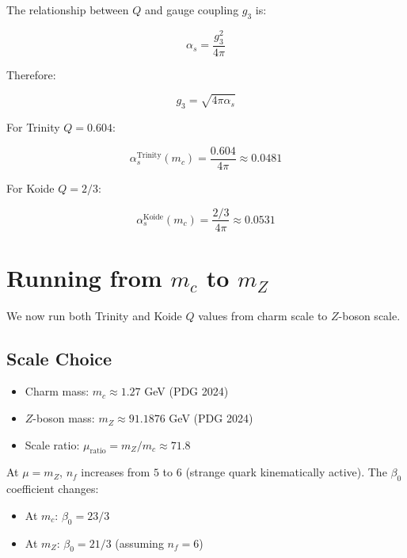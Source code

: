\documentclass{article}
\begin{document}
\begin{table}[h]
The relationship between $Q$ and gauge coupling $g_3$ is:

\begin{equation}
  \alpha_s = \frac{g_3^2}{4\pi}
  \label{eq:alpha-from-Q}
\end{equation}

Therefore:

\begin{equation}
  g_3 = \sqrt{4\pi \alpha_s}
  \label{eq:g-from-alpha}
\end{equation}

For Trinity $Q = 0.604$:

\begin{equation}
  \alpha_s^{\text{Trinity}}(m_c) = \frac{0.604}{4\pi} \approx 0.0481
  \label{eq:alpha-trinity}
\end{equation}

For Koide $Q = 2/3$:

\begin{equation}
  \alpha_s^{\text{Koide}}(m_c) = \frac{2/3}{4\pi} \approx 0.0531
  \label{eq:alpha-koide}
\end{equation}

\section{Running from $m_c$ to $m_Z$}

We now run both Trinity and Koide $Q$ values from charm scale to $Z$-boson scale.

\subsection{Scale Choice}

\begin{itemize}
  \item Charm mass: $m_c \approx 1.27$ GeV (PDG 2024)
  \item $Z$-boson mass: $m_Z \approx 91.1876$ GeV (PDG 2024)
  \item Scale ratio: $\mu_{\text{ratio}} = m_Z / m_c \approx 71.8$
\end{itemize}

At $\mu = m_Z$, $n_f$ increases from $5$ to $6$ (strange quark kinematically active). The $\beta_0$ coefficient changes:

\begin{itemize}
  \item At $m_c$: $\beta_0 = 23/3$
  \item At $m_Z$: $\beta_0 = 21/3$ (assuming $n_f = 6$)
\end{itemize}


\end{table}
\end{document}
